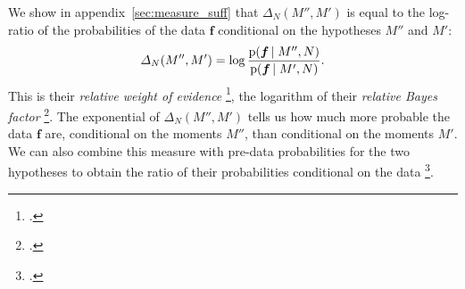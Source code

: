 \documentclass[\ifafour a4paper,12pt,\else a5paper,10pt,\fi%
onecolumn,oneside,article,%
british%
]{memoir}
\theoremstyle{remark}
\theoremstyle{innote}
\newcommand*{\citep}{\footcites}
\newcommand*{\pf}{\mathrm{p}}%
\renewcommand*{\|}{\nonscript\,\vert\nonscript\;\mathopen{}}
\newcommand*{\sect}{\S}%
\newcommand*{\chap}{ch.}%
\newcommand*{\chaps}{chs}%
\newcommand*{\cf}{{cf.}}
\newcommand*{\yff}{f}
\newcommand*{\yf}{\bm{\yff}}
\newcommand*{\ydi}{\varDelta}
\begin{document}
We show in appendix~\ref{sec:measure_suff} that $\ydi_{N}(M'',M')$ is equal
to the log-ratio of the probabilities of the data $\yf$ conditional on the
hypotheses $M''$ and $M'$:
\begin{equation}
  \label{eq:bayes_factor}
  \ydi_{N}(M'',M') =
  \log\frac{\pf(\yf \| M'',N)}{\pf(\yf \| M',N)}.
\end{equation}
This is their \emph{relative weight of evidence}
\citep[\chap~6]{good1950}{good1985}[\sect~1.4]{osteyeeetal1974}, the
logarithm of their \emph{relative Bayes factor}
\citep[p.~421]{jeffreys1936}[and references
therein]{kassetal1995}. %
The exponential of $\ydi_{N}(M'',M')$ tells us how much more probable the
data $\yf$ are, conditional on the moments $M''$, than conditional on the
moments $M'$. We can also combine this measure with pre-data probabilities
for the two hypotheses to obtain the ratio of their probabilities
conditional on the data \citep[\cf][]{bretthorst2013}.

%
%
% 
%
%

\bigskip
\end{document}
